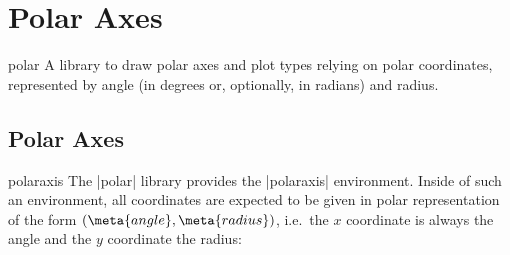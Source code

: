 \section{Polar Axes}
{
\def\pgfplotsmanualcurlibrary{polar}
\label{sec:polar}
%

\begin{pgfplotslibrary}{polar}
	A library to draw polar axes and plot types relying on polar coordinates, represented by angle (in degrees or, optionally, in radians) and radius.
\end{pgfplotslibrary}

\subsection{Polar Axes}
\begin{environment}{{polaraxis}}
	The |polar| library provides the |polaraxis| environment.
	 Inside of such an environment, all coordinates are expected to be given in polar representation of the form $(\meta{angle},\meta{radius})$, i.e.\ the $x$ coordinate is always the angle and the $y$ coordinate the radius:
\end{environment}
\begin{codeexample}[]
\end{codeexample}

\begin{codeexample}[]
\end{codeexample}

\begin{codeexample}[]
\end{codeexample}

}
